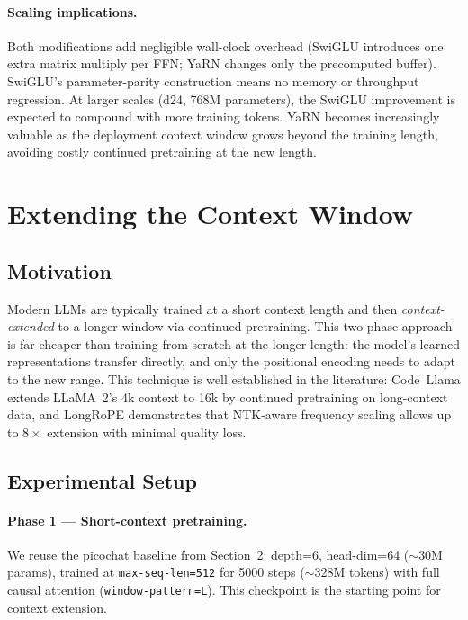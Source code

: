 \documentclass[a4paper,12pt]{article}
\begin{document}
\paragraph{Scaling implications.}
Both modifications add negligible wall-clock overhead (SwiGLU introduces one
extra matrix multiply per FFN; YaRN changes only the precomputed buffer).
SwiGLU's parameter-parity construction means no memory or throughput
regression.  At larger scales (d24, 768M parameters), the SwiGLU improvement
is expected to compound with more training tokens.  YaRN becomes increasingly
valuable as the deployment context window grows beyond the training length,
avoiding costly continued pretraining at the new length.

\newpage

\section{Extending the Context Window}

\subsection{Motivation}

Modern LLMs are typically trained at a short context length and then
\emph{context-extended} to a longer window via continued pretraining.
This two-phase approach is far cheaper than training from scratch at
the longer length: the model's learned representations transfer
directly, and only the positional encoding needs to adapt to the new
range.  This technique is well established in the literature:
Code~Llama \cite{roziere2023codellama} extends LLaMA~2's 4k context to
16k by continued pretraining on long-context data, and
LongRoPE \cite{ding2024longrope} demonstrates that NTK-aware
frequency scaling allows up to $8\times$ extension with minimal
quality loss.

\subsection{Experimental Setup}

\paragraph{Phase 1 — Short-context pretraining.}
We reuse the picochat baseline from Section~2: depth=6, head-dim=64
($\sim$30M params), trained at \texttt{max-seq-len=512} for 5000 steps
($\sim$328M tokens) with full causal attention (\texttt{window-pattern=L}).
This checkpoint is the starting point for context extension.
\end{document}
